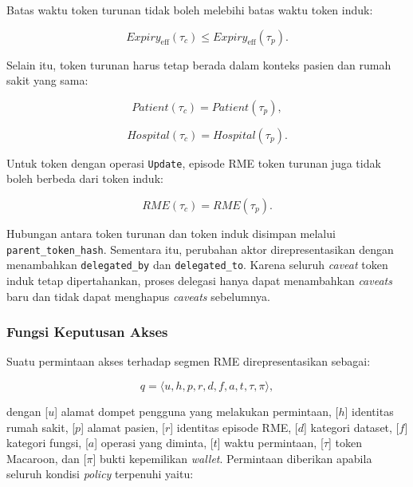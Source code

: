 Batas waktu token turunan tidak boleh melebihi batas waktu token induk:

\begin{equation}
	Expiry_{\operatorname{eff}}(\tau_c)
	\leq
	Expiry_{\operatorname{eff}}(\tau_p).
\end{equation}

Selain itu, token turunan harus tetap berada dalam konteks pasien dan rumah sakit yang sama:

\begin{equation}
	Patient(\tau_c)=Patient(\tau_p),
\end{equation}

\begin{equation}
	Hospital(\tau_c)=Hospital(\tau_p).
\end{equation}

Untuk token dengan operasi \texttt{Update}, episode RME token turunan juga tidak boleh berbeda dari token induk:

\begin{equation}
	RME(\tau_c)=RME(\tau_p).
\end{equation}

Hubungan antara token turunan dan token induk disimpan melalui \texttt{parent\_token\_hash}. Sementara itu, perubahan aktor direpresentasikan dengan menambahkan \texttt{delegated\_by} dan \texttt{delegated\_to}. Karena seluruh \textit{caveat} token induk tetap dipertahankan, proses delegasi hanya dapat menambahkan \textit{caveats} baru dan tidak dapat menghapus \textit{caveats} sebelumnya.

\subsubsection{Fungsi Keputusan Akses}

Suatu permintaan akses terhadap segmen RME direpresentasikan sebagai:

\begin{equation}
	q =
	\langle
	u,h,p,r,d,f,a,t,\tau,\pi
	\rangle,
	\label{eq:permintaan-akses}
\end{equation}

dengan [$u$] alamat dompet pengguna yang melakukan permintaan, [$h$] identitas rumah sakit, [$p$] alamat pasien, [$r$] identitas episode RME, [$d$] kategori dataset, [$f$] kategori fungsi, [$a$] operasi yang diminta, [$t$] waktu permintaan, [$\tau$] token Macaroon, dan [$\pi$] bukti kepemilikan \textit{wallet}. Permintaan diberikan apabila seluruh kondisi \textit{policy} terpenuhi yaitu:

